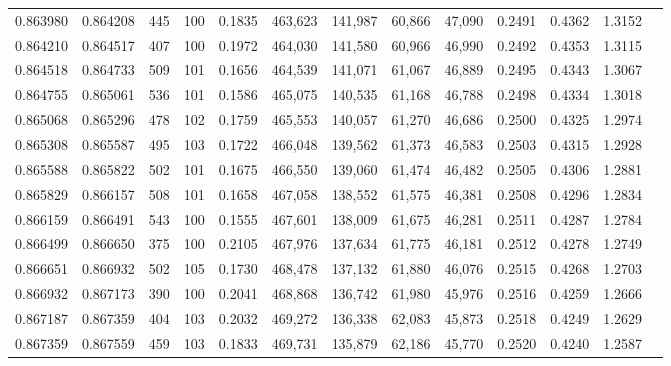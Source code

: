 \begin{tabular}{rrrrrrrrrrrrr}
0.863980 & 0.864208 &   445 & 100 &                                     0.1835 & 463,623 & 141,987 &  60,866 &  47,090 & 0.2491 & 0.4362 & 1.3152 \\
0.864210 & 0.864517 &   407 & 100 &                                     0.1972 & 464,030 & 141,580 &  60,966 &  46,990 & 0.2492 & 0.4353 & 1.3115 \\
0.864518 & 0.864733 &   509 & 101 &                                     0.1656 & 464,539 & 141,071 &  61,067 &  46,889 & 0.2495 & 0.4343 & 1.3067 \\
0.864755 & 0.865061 &   536 & 101 &                                     0.1586 & 465,075 & 140,535 &  61,168 &  46,788 & 0.2498 & 0.4334 & 1.3018 \\
0.865068 & 0.865296 &   478 & 102 &                                     0.1759 & 465,553 & 140,057 &  61,270 &  46,686 & 0.2500 & 0.4325 & 1.2974 \\
0.865308 & 0.865587 &   495 & 103 &                                     0.1722 & 466,048 & 139,562 &  61,373 &  46,583 & 0.2503 & 0.4315 & 1.2928 \\
0.865588 & 0.865822 &   502 & 101 &                                     0.1675 & 466,550 & 139,060 &  61,474 &  46,482 & 0.2505 & 0.4306 & 1.2881 \\
0.865829 & 0.866157 &   508 & 101 &                                     0.1658 & 467,058 & 138,552 &  61,575 &  46,381 & 0.2508 & 0.4296 & 1.2834 \\
0.866159 & 0.866491 &   543 & 100 &                                     0.1555 & 467,601 & 138,009 &  61,675 &  46,281 & 0.2511 & 0.4287 & 1.2784 \\
0.866499 & 0.866650 &   375 & 100 &                                     0.2105 & 467,976 & 137,634 &  61,775 &  46,181 & 0.2512 & 0.4278 & 1.2749 \\
0.866651 & 0.866932 &   502 & 105 &                                     0.1730 & 468,478 & 137,132 &  61,880 &  46,076 & 0.2515 & 0.4268 & 1.2703 \\
0.866932 & 0.867173 &   390 & 100 &                                     0.2041 & 468,868 & 136,742 &  61,980 &  45,976 & 0.2516 & 0.4259 & 1.2666 \\
0.867187 & 0.867359 &   404 & 103 &                                     0.2032 & 469,272 & 136,338 &  62,083 &  45,873 & 0.2518 & 0.4249 & 1.2629 \\
0.867359 & 0.867559 &   459 & 103 &                                     0.1833 & 469,731 & 135,879 &  62,186 &  45,770 & 0.2520 & 0.4240 & 1.2587 \\

\end{tabular}
